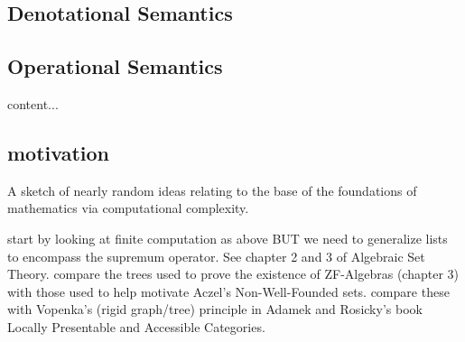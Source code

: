 \documentclass[a4paper,openany]{amsbook}
\begin{document}
\begin{prooftree}
\end{prooftree}

\begin{prooftree}
\end{prooftree}


\subsection{Denotational Semantics}



\subsection{Operational Semantics}



\begin{definition}
content...
\end{definition}

\subsection{motivation}

A sketch of nearly random ideas relating to the base of the foundations of
mathematics via computational complexity.

start by looking at finite computation as above BUT we need to generalize lists
to encompass the supremum operator. See chapter 2 and 3 of Algebraic Set Theory.
compare the trees used to prove the existence of ZF-Algebras (chapter 3) with
those used to help motivate Aczel's Non-Well-Founded sets. compare these with
Vopenka's (rigid graph/tree) principle in Adamek and Rosicky's book Locally
Presentable and Accessible Categories.
\end{document}
